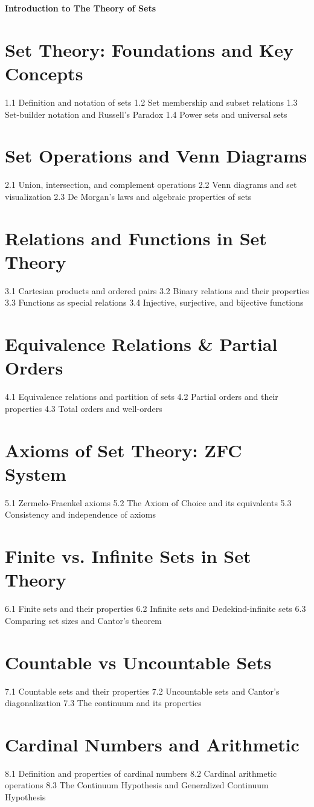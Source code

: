 {\LARGE \bf{Introduction to The Theory of Sets}}
\section{Set Theory: Foundations and Key Concepts}
1.1 Definition and notation of sets
1.2 Set membership and subset relations
1.3 Set-builder notation and Russell's Paradox
1.4 Power sets and universal sets
\section{Set Operations and Venn Diagrams}
2.1 Union, intersection, and complement operations
2.2 Venn diagrams and set visualization
2.3 De Morgan's laws and algebraic properties of sets
\section{Relations and Functions in Set Theory}
3.1 Cartesian products and ordered pairs
3.2 Binary relations and their properties
3.3 Functions as special relations
3.4 Injective, surjective, and bijective functions
\section{Equivalence Relations \& Partial Orders}
4.1 Equivalence relations and partition of sets
4.2 Partial orders and their properties
4.3 Total orders and well-orders
\section{Axioms of Set Theory: ZFC System}
5.1 Zermelo-Fraenkel axioms
5.2 The Axiom of Choice and its equivalents
5.3 Consistency and independence of axioms
\section{Finite vs. Infinite Sets in Set Theory}
6.1 Finite sets and their properties
6.2 Infinite sets and Dedekind-infinite sets
6.3 Comparing set sizes and Cantor's theorem
\section{Countable vs Uncountable Sets}
7.1 Countable sets and their properties
7.2 Uncountable sets and Cantor's diagonalization
7.3 The continuum and its properties
\section{Cardinal Numbers and Arithmetic}
8.1 Definition and properties of cardinal numbers
8.2 Cardinal arithmetic operations
8.3 The Continuum Hypothesis and Generalized Continuum Hypothesis
